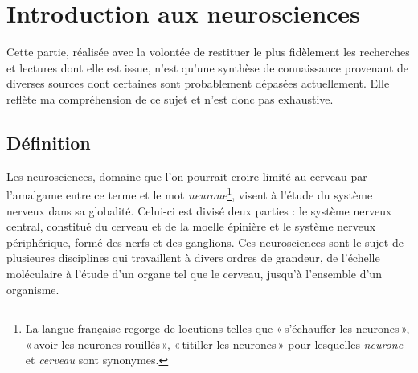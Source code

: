 \documentclass[12pt,fleqn,oneside,openany]{book} %
\begin{document}
\section{Introduction aux neurosciences} \label{sec:introNeuro}
\begin{remark}
	Cette partie, réalisée avec la volontée de restituer le plus fidèlement les recherches et lectures dont elle est issue, n'est qu'une synthèse de connaissance provenant de diverses sources dont certaines sont probablement dépasées actuellement. Elle reflète ma compréhension de ce sujet et n'est donc pas exhaustive.
\end{remark}

\subsection[Définition]{Définition \cite{wikineuro}} \label{ssec:definition} %
Les neurosciences, domaine que l'on pourrait croire limité au cerveau par l'amalgame entre ce terme et le mot \emph{neurone}\footnote{La langue française regorge de locutions telles que «\,s'échauffer les neurones\,», «\,avoir les neurones rouillés\,», «\,titiller les neurones\,» pour lesquelles \emph{neurone} et \emph{cerveau} sont synonymes.}, visent à l'étude du système nerveux dans sa globalité. Celui-ci est divisé deux parties : le système nerveux central, constitué du cerveau et de la moelle épinière et le système nerveux périphérique, formé des nerfs et des ganglions. Ces neurosciences sont le sujet de plusieures disciplines qui travaillent à divers ordres de grandeur, de l'échelle moléculaire à l'étude d'un organe tel que le cerveau, jusqu'à l'ensemble d'un organisme.

\begin{figure}[h]
\end{figure}
\end{document}
